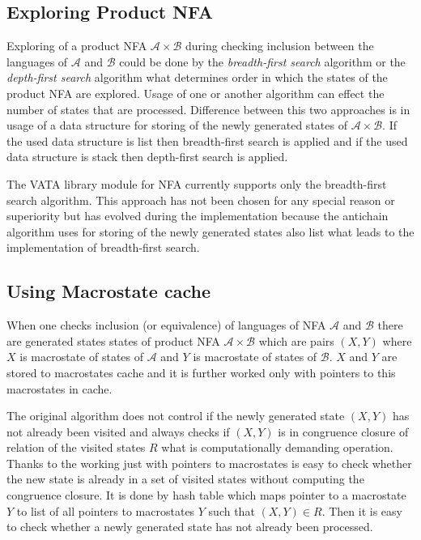 \subsection{Exploring Product NFA}
Exploring of a product NFA $\mathcal{A}\times\mathcal{B}$ during checking inclusion between the languages of $\mathcal{A}$ and $\mathcal{B}$ could be done by 
the \emph{breadth-first search} \cite{taocp} algorithm or the \emph{depth-first search} \cite{taocp} algorithm what
determines order in which the states of the product NFA are explored. Usage of one or another algorithm can effect the number of states that are processed. 
Difference between this two approaches is in usage of a data structure for storing of the newly generated states of $\mathcal{A}\times\mathcal{B}$.
If the used data structure is list then breadth-first search is applied and if the used data structure is stack then 
depth-first search is applied.

The VATA library module for NFA currently supports only the breadth-first search algorithm. This approach has not been chosen for any special reason or superiority
but has evolved during the implementation because the antichain algorithm uses for storing of 
the newly generated states also list what leads to the implementation of breadth-first search.


\subsection{Using Macrostate cache}
When one checks inclusion (or equivalence) of languages of NFA $\mathcal{A}$ and $\mathcal{B}$ there are generated states states of product NFA $\mathcal{A}
\times \mathcal{B}$ which are pairs $(X,Y)$ where $X$ is macrostate of states of $\mathcal{A}$ and $Y$ is macrostate of states of $\mathcal{B}$. $X$ and $Y$
are stored to macrostates cache and it is further worked only with pointers to this macrostates in cache.

The original algorithm does not control if the newly generated state $(X,Y)$ has not already been visited and always checks if $(X,Y)$ is in
congruence closure of relation of the visited states $R$  what is
computationally demanding operation. Thanks to the working just with pointers to macrostates is easy to check whether the new state is already in a set of 
visited states without computing the congruence closure. It is done by hash table which maps pointer to a macrostate $Y$ to list of all
pointers to macrostates $Y$ such that $(X,Y)\in R$. Then it is easy to check whether a newly generated state has not already been processed. 

